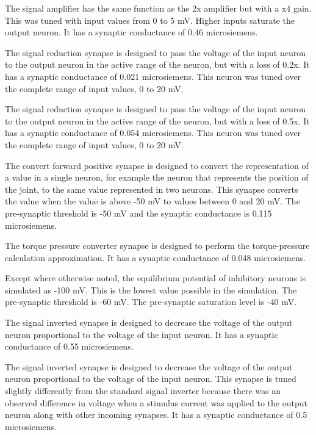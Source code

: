The signal amplifier has the same function as the 2x amplifier but with a x4 
gain. This was tuned with input values from 0 to
5 mV. Higher inputs saturate the output neuron. It has a synaptic conductance
of 0.46 microsiemens.


The signal reduction synapse is designed to pass the voltage of the input neuron
to the output neuron in the active range of the neuron, but with a loss of 0.2x. 
It has a synaptic  conductance of 0.021 microsiemens. This neuron was tuned
over the complete range of input values, 0 to 20 mV.


The signal reduction synapse is designed to pass the voltage of the input neuron
to the output neuron in the active range of the neuron, but with a loss of 0.5x. 
It has a synaptic  conductance of 0.054 microsiemens. This neuron was tuned
over the complete range of input values, 0 to 20 mV.


The convert forward positive synapse is designed to convert the representation
of a value in a single neuron, for example the neuron that represents the 
position of the joint, to the same value represented in two neurons. This
synapse converts the value when the value is above -50 mV to values between 0 
and 20 mV. The pre-synaptic
threshold is -50 mV and the synaptic conductance is 0.115 microsiemens.


The torque pressure converter synapse is designed to perform the torque-pressure
calculation approximation. It has a synaptic 
conductance of 0.048 microsiemens.


Except where otherwise noted, the equilibrium potential of inhibitory neurons
is simulated as -100 mV. This is the lowest value possible in the simulation.
The pre-synaptic threshold is -60 mV. The pre-synaptic saturation level is -40
mV.


The signal inverted synapse is designed to decrease the voltage of the output 
neuron proportional to the voltage of the input neuron. It has a synaptic 
conductance of 0.55 microsiemens.


The signal inverted synapse is designed to decrease the voltage of the output 
neuron proportional to the voltage of the input neuron. This synapse is tuned
slightly differently from the standard signal inverter because there was an
observed difference in voltage when a stimulus current was applied to the output
neuron along with other incoming synapses. It has a synaptic 
conductance of 0.5 microsiemens.

